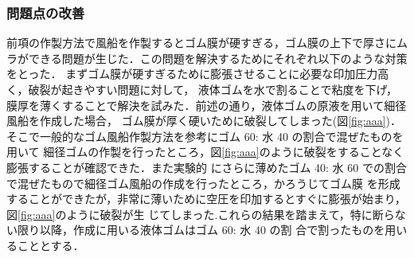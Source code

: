 \subsubsection{問題点の改善}
前項の作製方法で風船を作製するとゴム膜が硬すぎる，ゴム膜の上下で厚さにムラができる問題が生じた．この問題を解決するためにそれぞれ以下のような対策をとった．
まずゴム膜が硬すぎるために膨張させることに必要な印加圧力高く，破裂が起きやすい問題に対して，
液体ゴムを水で割ることで粘度を下げ，膜厚を薄くすることで解決を試みた．前述の通り，液体ゴムの原液を用いて細径風船を作成した場合，
ゴム膜が厚く硬いために破裂してしまった(図\ref{fig:aaa})．そこで一般的なゴム風船作製方法\cite{91}を参考にゴム 60: 水 40 の割合で混ぜたものを用いて
細径ゴムの作製を行ったところ，図\ref{fig:aaa}のように破裂をすることなく膨張することが確認できた．また実験的
にさらに薄めたゴム 40: 水 60 での割合で混ぜたもので細径ゴム風船の作成を行ったところ，かろうじてゴム膜
を形成することができたが，非常に薄いために空圧を印加するとすぐに膨張が始まり，図\ref{fig:aaa}のように破裂が生
じてしまった.これらの結果を踏まえて，特に断らない限り以降，作成に用いる液体ゴムはゴム 60: 水 40 の割
合で割ったものを用いることとする．


